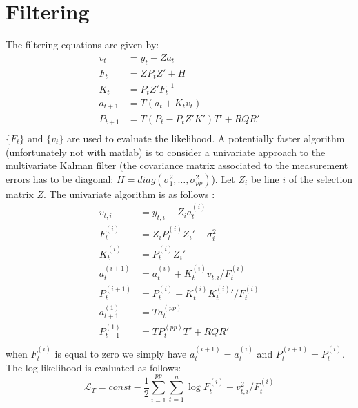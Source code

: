 \documentclass{amsart}
\theoremstyle{definition}
\theoremstyle{remark}
\numberwithin{equation}{section}
\begin{document}
\section{Filtering}

\noindent The filtering equations are given by:
\begin{equation}
\begin{split}
v_t &= y_t - Z  a_t\\
F_t &= Z P_t Z' + H\\
K_t &= P_t Z' F_t^{-1}\\
a_{t+1} &= T (a_t + K_t v_t)\\
P_{t+1} &= T (P_t - P_tZ'K') T' + R Q R'\\
\end{split}
\end{equation}
$\{F_t\}$ and $\{v_t\}$ are used to evaluate the likelihood. A
potentially faster algorithm (unfortunately not with matlab) is to
consider a univariate approach to the multivariate Kalman filter
(the covariance matrix associated to the measurement errors has to
be diagonal: $H=diag(\sigma_1^2,\dots,\sigma_{pp}^2)$). Let $Z_i$
be line $i$ of the selection matrix $Z$. The univariate algorithm
is as follows :
\begin{equation}
\begin{split}
v_{t,i} &= y_{t,i} - Z_i  a_t^{(i)}\\
F_t^{(i)} &= Z_i P_t^{(i)} Z_i' + \sigma_{i}^2\\
K_t^{(i)} &= P_t^{(i)} Z_i'\\
a_{t}^{(i+1)} &= a_t^{(i)} + K_t^{(i)} v_{t,i} / F_t^{(i)}\\
P_{t}^{(i+1)} &= P_{t}^{(i)} - K_{t}^{(i)} \left.K_t^{(i)}\right.' / F_t^{(i)}\\
a_{t+1}^{(1)} &= T a_t^{(pp)}\\
P_{t+1}^{(1)} &= T P_t^{(pp)} T' + R Q R'\\
\end{split}
\end{equation}
when $F_t^{(i)}$ is equal to zero we simply have
$a_{t}^{(i+1)}=a_{t}^{(i)}$ and $P_{t}^{(i+1)}=P_{t}^{(i)}$. The
log-likelihood is evaluated as follows:
\begin{equation}
\mathcal{L}_T = const -\frac{1}{2}\sum_{i=1}^{pp}\sum_{t=1}^n \log
F_{t}^{(i)} + v_{t,i}^2 / F_{t}^{(i)}
\end{equation}

\bigskip
\end{document}
